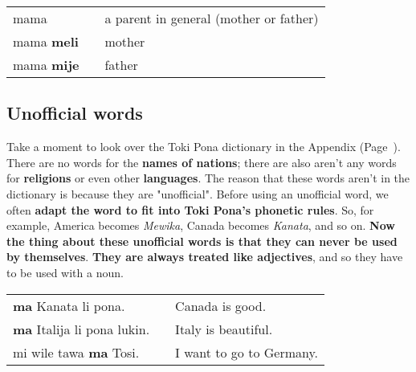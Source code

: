 \begin{supertabular}{p{5,5cm}|ll}
mama && a parent in general (mother or father) \\
mama \textbf{meli} && mother \\
mama \textbf{mije} && father \\
\end{supertabular} 

%
\subsection*{Unofficial words}
%
Take a moment to look over the Toki Pona dictionary in the Appendix (Page~\pageref{'unofficial_words'}). 
There are no words for the \textbf{names of nations}; there are also aren't any words for \textbf{religions} or even other \textbf{languages}. 
The reason that these words aren't in the dictionary is because they are "unofficial". 
Before using an unofficial word, we often \textbf{adapt the word to fit into Toki Pona's phonetic rules}. 
So, for example, America becomes \textit{Mewika}, Canada becomes \textit{Kanata}, and so on. 
\textbf{Now the thing about these unofficial words is that they can never be used by themselves}. 
\textbf{They are always treated like adjectives}, and so they have to be used with a noun. 

\begin{supertabular}{p{5,5cm}|ll}
\textbf{ma} Kanata li pona. && Canada is good. \\
\textbf{ma} Italija li pona lukin. && Italy is beautiful. \\
mi wile tawa \textbf{ma} Tosi. && I want to go to Germany. \\
\end{supertabular} 

